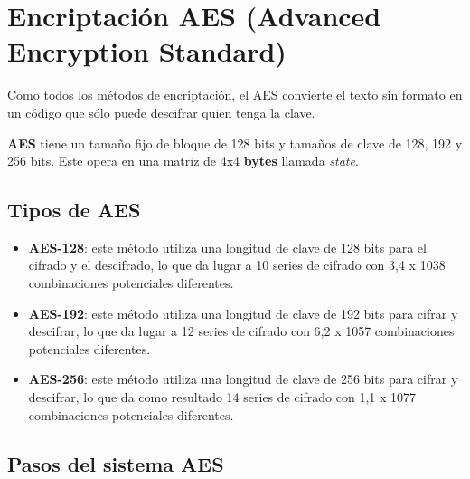 \documentclass[a4paper, 12pt]{article}
\begin{document}
\section*{Encriptación AES (Advanced Encryption
Standard)}\label{encriptaciuxf3n-aes-advanced-encryption-standard}

Como todos los métodos de encriptación, el AES convierte el texto sin
formato en un código que sólo puede descifrar quien tenga la clave.

\textbf{AES} tiene un tamaño fijo de bloque de 128 bits y tamaños de
clave de 128, 192 y 256 bits. Este opera en una matriz de 4x4
\textbf{bytes} llamada \emph{state}.

\subsection*{Tipos de AES}\label{tipos-de-aes}

\begin{itemize}
\item
	\textbf{AES-128}: este método utiliza una longitud de clave de 128 bits para el
  cifrado y el descifrado, lo que da lugar a 10 series de cifrado con
  3,4 x 1038 combinaciones potenciales diferentes.
\item
  \textbf{AES-192}: este método utiliza una longitud de clave de 192 bits para
  cifrar y descifrar, lo que da lugar a 12 series de cifrado con 6,2 x
  1057 combinaciones potenciales diferentes.
\item
  \textbf{AES-256}: este método utiliza una longitud de clave de 256 bits para
  cifrar y descifrar, lo que da como resultado 14 series de cifrado con
  1,1 x 1077 combinaciones potenciales diferentes.
\end{itemize}

\subsection*{Pasos del sistema AES}\label{pasos-del-sistema-aes}
\end{document}
